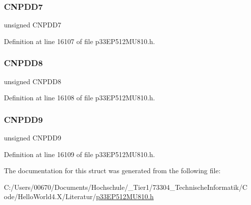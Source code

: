 \subsubsection{\texorpdfstring{C\+N\+P\+D\+D7}{CNPDD7}}
{\footnotesize\ttfamily unsigned C\+N\+P\+D\+D7}



Definition at line 16107 of file p33\+E\+P512\+M\+U810.\+h.

\mbox{\label{structtag_c_n_p_d_d_b_i_t_s_a06d43dd6808104ee0cc264e4dda938d2}} 
\subsubsection{\texorpdfstring{C\+N\+P\+D\+D8}{CNPDD8}}
{\footnotesize\ttfamily unsigned C\+N\+P\+D\+D8}



Definition at line 16108 of file p33\+E\+P512\+M\+U810.\+h.

\mbox{\label{structtag_c_n_p_d_d_b_i_t_s_a6e596db7dc397068c09fd1eb083ed114}} 
\subsubsection{\texorpdfstring{C\+N\+P\+D\+D9}{CNPDD9}}
{\footnotesize\ttfamily unsigned C\+N\+P\+D\+D9}



Definition at line 16109 of file p33\+E\+P512\+M\+U810.\+h.



The documentation for this struct was generated from the following file\+:\begin{DoxyCompactItemize}
\item 
C\+:/\+Users/00670/\+Documents/\+Hochschule/\+\_\+\+Tier1/73304\+\_\+\+Technische\+Informatik/\+Code/\+Hello\+World4.\+X/\+Literatur/\hyperlink{p33_e_p512_m_u810_8h}{p33\+E\+P512\+M\+U810.\+h}\end{DoxyCompactItemize}
